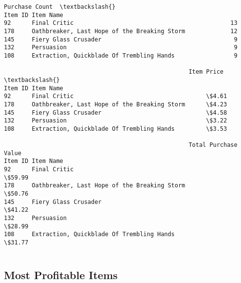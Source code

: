 \documentclass[11pt]{article}
\makeatletter
\newcommand{\boxspacing}{\kern\kvtcb@left@rule\kern\kvtcb@boxsep}
\newcommand{\prompt}[4]{
        {\ttfamily\llap{{\color{#2}[#3]:\hspace{3pt}#4}}\vspace{-\baselineskip}}
    }
\makeatother
\begin{document}
            \begin{tcolorbox}[breakable, size=fbox, boxrule=.5pt, pad at break*=1mm, opacityfill=0]
\prompt{Out}{outcolor}{9}{\boxspacing}
\begin{Verbatim}[commandchars=\\\{\}]
                                                     Purchase Count  \textbackslash{}
Item ID Item Name
92      Final Critic                                             13
178     Oathbreaker, Last Hope of the Breaking Storm             12
145     Fiery Glass Crusader                                      9
132     Persuasion                                                9
108     Extraction, Quickblade Of Trembling Hands                 9

                                                     Item Price  \textbackslash{}
Item ID Item Name
92      Final Critic                                      \$4.61
178     Oathbreaker, Last Hope of the Breaking Storm      \$4.23
145     Fiery Glass Crusader                              \$4.58
132     Persuasion                                        \$3.22
108     Extraction, Quickblade Of Trembling Hands         \$3.53

                                                     Total Purchase Value
Item ID Item Name
92      Final Critic                                               \$59.99
178     Oathbreaker, Last Hope of the Breaking Storm               \$50.76
145     Fiery Glass Crusader                                       \$41.22
132     Persuasion                                                 \$28.99
108     Extraction, Quickblade Of Trembling Hands                  \$31.77
\end{Verbatim}
\end{tcolorbox}
        
    \begin{tcolorbox}[breakable, size=fbox, boxrule=1pt, pad at break*=1mm,colback=cellbackground, colframe=cellborder]
\prompt{In}{incolor}{ }{\boxspacing}
\begin{Verbatim}[commandchars=\\\{\}]

\end{Verbatim}
\end{tcolorbox}

    \hypertarget{most-profitable-items}{%
\subsection{Most Profitable Items}\label{most-profitable-items}}
\end{document}
